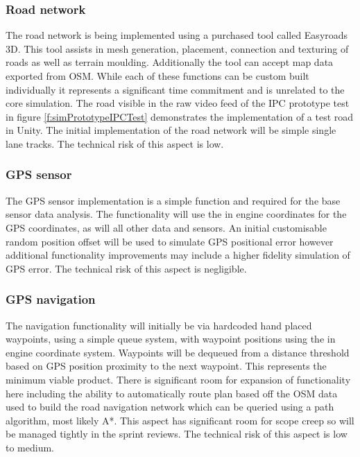 \documentclass[]{aiaa-tc}%
\begin{document}
\subsubsection{Road network}

The road network is being implemented using a purchased tool called Easyroads 3D. This tool assists in mesh generation, placement, connection and texturing of roads as well as terrain moulding. Additionally the tool can accept map data exported from OSM. While each of these functions can be custom built individually it represents a significant time commitment and is unrelated to the core simulation. The road visible in the raw video feed of the IPC prototype test in figure \ref{f:simPrototypeIPCTest} demonstrates the implementation of a test road in Unity. The initial implementation of the road network will be simple single lane tracks. The technical risk of this aspect is low.

\subsubsection{GPS sensor}

The GPS sensor implementation is a simple function and required for the base sensor data analysis. The functionality will use the in engine coordinates for the GPS coordinates, as will all other data and sensors. An initial customisable random position offset will be used to simulate GPS positional error however additional functionality improvements may include a higher fidelity simulation of GPS error. The technical risk of this aspect is negligible.

\subsubsection{GPS navigation}\label{s:gpsNavSim}

The navigation functionality will initially be via hardcoded hand placed waypoints, using a simple queue system, with waypoint positions using the in engine coordinate system. Waypoints will be dequeued from a distance threshold based on GPS position proximity to the next waypoint. This represents the minimum viable product. There is significant room for expansion of functionality here including the ability to automatically route plan based off the OSM data used to build the road navigation network which can be queried using a path algorithm, most likely A*. This aspect has significant room for scope creep so will be managed tightly in the sprint reviews. The technical risk of this aspect is low to medium.
\end{document}
